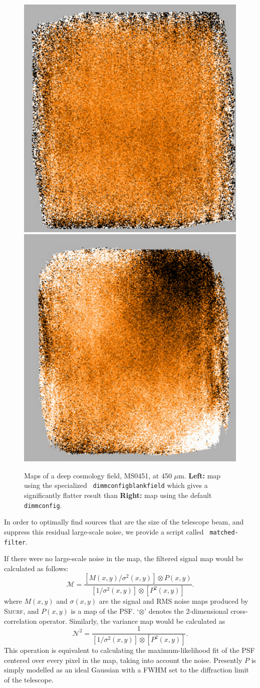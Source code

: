 \documentclass[twoside,11pt]{article}
\newcommand{\micron}{\mbox{\,${\mu}$m}}            %
\newcommand{\xref}[3]{#1}
\renewcommand{\_}{\texttt{\symbol{95}}}
\newcommand{\smurf}{\xref{\textsc{Smurf}}{sun258}{}}
\begin{document}
\begin{figure}
\begin{center}
\includegraphics[width=0.49\linewidth]{sc19_cosmo_map}
\includegraphics[width=0.49\linewidth]{sc19_cosmo_map_default} \\
\caption{Maps of a deep cosmology field, MS0451, at 450\,\micron. {\bf
    Left:} map using the specialized \texttt{
    dimmconfig\_blank\_field} which gives a significantly flatter
  result than {\bf Right:} map using the default \texttt{
    dimmconfig}.}
\label{fig:cosmomap}
\end{center}
\end{figure}

In order to optimally find sources that are the size of the telescope
beam, and suppress this residual large-scale noise, we provide a
script called \texttt{ matched-filter}.

If there were no large-scale noise in the map, the filtered signal map
would be calculated as follows:
%
\begin{equation}
\mathcal{M} = \frac{[M(x,y)/\sigma^2(x,y)] \otimes P(x,y)}
  {[1/\sigma^2(x,y)] \otimes [P^2(x,y)]}.
\end{equation}
%
where $M(x,y)$ and $\sigma(x,y)$ are the signal and RMS
noise maps produced by \smurf, and $P(x,y)$ is a map of the
PSF. `$\otimes$' denotes the 2-dimensional cross-correlation
operator. Similarly, the variance map would be calculated as
%
\begin{equation}
  \mathcal{N}^2 = \frac{1}{[1/\sigma^2(x,y)] \otimes [P^2(x,y)]}.
\end{equation}
%
This operation is equivalent to calculating the maximum-likelihood fit
of the PSF centered over every pixel in the map, taking into account
the noise. Presently $P$ is simply modelled as an ideal Gaussian
with a FWHM set to the diffraction limit of the telescope.
\end{document}
